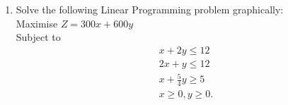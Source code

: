 \begin{enumerate}



\item Solve the following Linear Programming problem graphically:\\ Maximise $Z=300x + 600y $\\
	Subject to \begin{align}x + 2y \le 12\\
		2x + y \le 12\\
		x +\frac{5}{4}y \ge 5\\
		x \ge 0 , y \ge 0.\end{align}

\end{enumerate}
